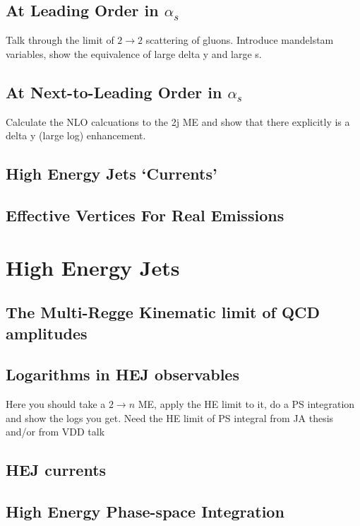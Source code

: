 	\subsection{At Leading Order in $\alpha_s$}
	\label{sub:HE22_LO}

	Talk through the limit of $2\rightarrow2$ scattering of gluons.  Introduce mandelstam variables, show the equivalence of large delta y and large s.

	\subsection{At Next-to-Leading Order in $\alpha_s$}
	\label{sub:HE22_NLO}

	Calculate the NLO calcuations to the 2j ME and show that there explicitly is a delta y (large log) enhancement.

	\subsection{High Energy Jets `Currents'}
	\label{sub:currents}

	\subsection{Effective Vertices For Real Emissions}
	\label{sub:effective_vertices_for_real_emissions}

\section{High Energy Jets}
\label{sec:section_name}

	\subsection{The Multi-Regge Kinematic limit of QCD amplitudes}
	\label{sub:subsection_name}

	\subsection{Logarithms in HEJ observables}
	\label{sub:subsection_name}

		Here you should take a $2\rightarrow n$ ME, apply the HE limit to it, do a PS integration and show the logs you get.  Need the HE limit of PS integral from JA thesis and/or from VDD talk

	\subsection{HEJ currents}
	\label{sub:currents}

	\subsection{High Energy Phase-space Integration}
	\label{sub:HEPhaseSpace}

